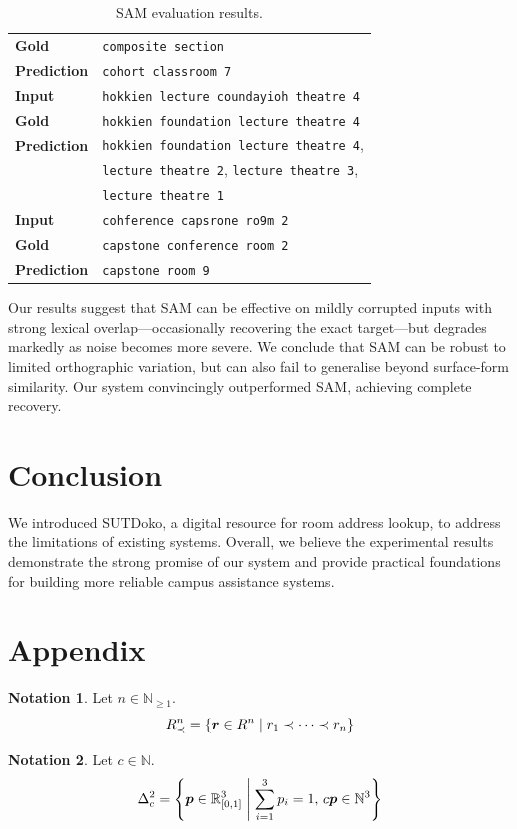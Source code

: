\documentclass{article}
\theoremstyle{definition}
\newtheorem{notation}{Notation}
\newcommand{\N}{\mathbb{N}}
\newcommand{\R}{\mathbb{R}}
\begin{document}
\begin{table}[H]
\begin{tabularx}{\linewidth}{lX}
		\textbf{Gold} & \texttt{composite section} \\
		\textbf{Prediction} & \texttt{cohort classroom 7} \\
		\midrule
		\textbf{Input} & \texttt{hokkien lecture coundayioh theatre 4} \\
		\textbf{Gold} & \texttt{hokkien foundation lecture theatre 4} \\
		\textbf{Prediction} & \texttt{hokkien foundation lecture theatre 4}, \\
		& \texttt{lecture theatre 2}, \texttt{lecture theatre 3}, \\
		& \texttt{lecture theatre 1} \\
		\midrule
		\textbf{Input} & \texttt{cohference capsrone ro9m 2} \\
		\textbf{Gold} & \texttt{capstone conference room 2} \\
		\textbf{Prediction} & \texttt{capstone room 9} \\
		\bottomrule
	\end{tabularx}
	\caption{SAM evaluation results.}
\end{table}

\newpage

Our results suggest that SAM can be effective on mildly corrupted inputs with strong lexical overlap---occasionally recovering the exact target---but degrades markedly as noise becomes more severe.
We conclude that SAM can be robust to limited orthographic variation,
but can also fail to generalise beyond surface-form similarity.
Our system convincingly outperformed SAM, achieving complete recovery.

\section{Conclusion}

We introduced SUTDoko,
a digital resource for room address lookup,
to address the limitations of existing systems.
Overall, we believe the experimental results demonstrate the strong promise of our system
and provide practical foundations for building more reliable campus assistance systems.

\section{Appendix}

\begin{notation}
Let $n\in\N_{\geq 1}$.
$$
	R_{\prec}^{n}
	=
	\mleft\{
		\bm{r}\in R^{n}
		\;\middle|\;
		r_{1}\prec\dots\prec r_{n}
	\mright\}
$$
\end{notation}

\begin{notation}
Let $c\in\N$.
$$
	\Delta_{c}^{2}
	=
	\mleft\{
		\bm{p}\in\R_{[0,1]}^{3}
		\;\middle|\;
		\sum_{i=1}^{3}
		p_{i}
		=
		1
		,\,
		c\bm{p}\in\N^{3}
	\mright\}
$$
\end{notation}



\end{document}
